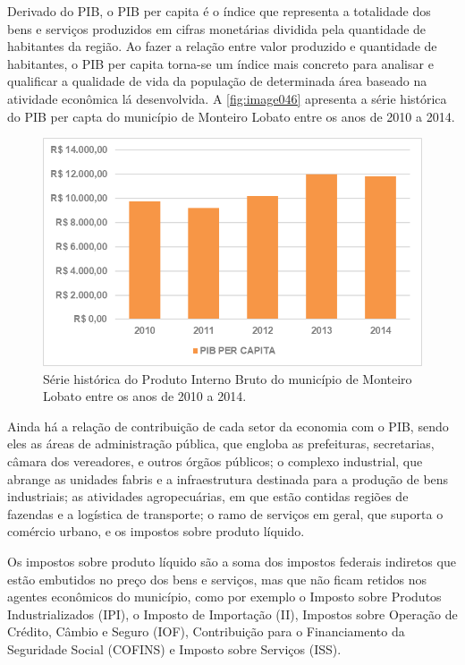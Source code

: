 Derivado do PIB, o PIB per capita é o índice que representa a totalidade dos bens e serviços produzidos em cifras monetárias dividida pela quantidade de habitantes da região. Ao fazer a relação entre valor produzido e quantidade de habitantes, o PIB per capita torna-se um índice mais concreto para analisar e qualificar a qualidade de vida da população de determinada área baseado na atividade econômica lá desenvolvida. A \autoref{fig:image046} apresenta a série histórica do PIB per capta do município de Monteiro Lobato entre os anos de 2010 a 2014.

 \begin{figure}[h!]
	\centering
	\includegraphics[width=0.75\linewidth]{produtos/proddois/image046}
	\caption{Série histórica do Produto Interno Bruto do município de Monteiro Lobato entre os anos de 2010 a 2014.}
	\label{fig:image046}
\end{figure}

Ainda há a relação de contribuição de cada setor da economia com o PIB, sendo eles as áreas de administração pública, que engloba as prefeituras, secretarias, câmara dos vereadores, e outros órgãos públicos; o complexo industrial, que abrange as unidades fabris e a infraestrutura destinada para a produção de bens industriais; as atividades agropecuárias, em que estão contidas regiões de fazendas e a logística de transporte; o ramo de serviços em geral, que suporta o comércio urbano, e os impostos sobre produto líquido.

Os impostos sobre produto líquido são a soma dos impostos federais indiretos que estão embutidos no preço dos bens e serviços, mas que não ficam retidos nos agentes econômicos do município, como por exemplo o Imposto sobre Produtos Industrializados (IPI), o Imposto de Importação (II), Impostos sobre Operação de Crédito, Câmbio e Seguro (IOF), Contribuição para o Financiamento da Seguridade Social (COFINS) e Imposto sobre Serviços (ISS).

